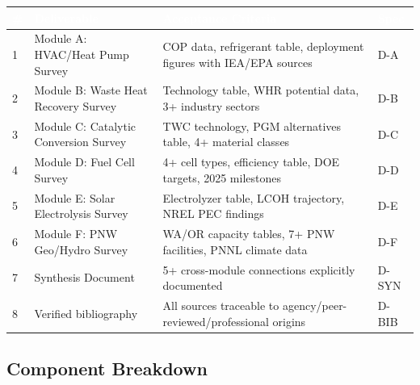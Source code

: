 \documentclass[11pt,letterpaper]{article}
\newcommand{\tableheader}[1]{\textbf{\sffamily\textcolor{white}{#1}}}
\begin{document}
\begin{center}
\begin{tabularx}{\textwidth}{C{0.5cm}L{4cm}L{5cm}L{3cm}}
\toprule
{}
\tableheader{\#} & \tableheader{Deliverable} & \tableheader{Acceptance Criteria} & \tableheader{Spec} \\
 & Module A: HVAC/Heat Pump Survey & COP data, refrigerant table, deployment figures with IEA/EPA sources & D-A \\
2 & Module B: Waste Heat Recovery Survey & Technology table, WHR potential data, 3+ industry sectors & D-B \\
3 & Module C: Catalytic Conversion Survey & TWC technology, PGM alternatives table, 4+ material classes & D-C \\
4 & Module D: Fuel Cell Survey & 4+ cell types, efficiency table, DOE targets, 2025 milestones & D-D \\
5 & Module E: Solar Electrolysis Survey & Electrolyzer table, LCOH trajectory, NREL PEC findings & D-E \\
6 & Module F: PNW Geo/Hydro Survey & WA/OR capacity tables, 7+ PNW facilities, PNNL climate data & D-F \\
7 & Synthesis Document & 5+ cross-module connections explicitly documented & D-SYN \\
8 & Verified bibliography & All sources traceable to agency/peer-reviewed/professional origins & D-BIB \\
\bottomrule
\end{tabularx}
\end{center}

\subsection{Component Breakdown}
\end{document}
